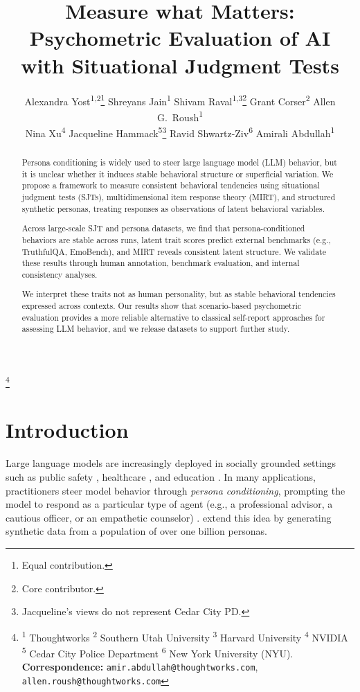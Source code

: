 \documentclass[11pt]{article}
\title{Measure what Matters: Psychometric Evaluation of AI with Situational Judgment Tests}
\author{
  Alexandra Yost\textsuperscript{1,2}\thanks{Equal contribution.}\quad
  Shreyans Jain\textsuperscript{1}\footnotemark[1]\quad
  Shivam Raval\textsuperscript{1,3}\thanks{Core contributor.}\quad
  Grant Corser\textsuperscript{2}\footnotemark[2]\quad
  Allen G.\ Roush\textsuperscript{1}\footnotemark[2]\\
  Nina Xu\textsuperscript{4}\footnotemark[2]\quad
  Jacqueline Hammack\textsuperscript{5}\thanks{Jacqueline's views do not represent Cedar City PD.}\quad
  Ravid Shwartz\mbox{-}Ziv\textsuperscript{6}\quad
  Amirali Abdullah\textsuperscript{1}\footnotemark[2]
}
\newcommand{\blfootnote}[1]{%
  \begingroup
  \renewcommand\thefootnote{}\footnote{#1}%
  \addtocounter{footnote}{-1}%
  \endgroup
}
\begin{document}
\maketitle

\blfootnote{\small
\textsuperscript{1} Thoughtworks \quad
\textsuperscript{2} Southern Utah University \quad
\textsuperscript{3} Harvard University \quad
\textsuperscript{4} NVIDIA \quad
\textsuperscript{5} Cedar City Police Department \quad
\textsuperscript{6} New York University (NYU).\\
\textbf{Correspondence: } \texttt{amir.abdullah@thoughtworks.com}, \texttt{allen.roush@thoughtworks.com}
}

\begin{abstract}

Persona conditioning is widely used to steer large language model (LLM) behavior, but it is unclear whether it induces stable behavioral structure or superficial variation. We propose a framework to measure consistent behavioral tendencies using situational judgment tests (SJTs), multidimensional item response theory (MIRT), and structured synthetic personas, treating responses as observations of latent behavioral variables.

Across large-scale SJT and persona datasets, we find that persona-conditioned behaviors are stable across runs, latent trait scores predict external benchmarks (e.g., TruthfulQA, EmoBench), and MIRT reveals consistent latent structure. We validate these results through human annotation, benchmark evaluation, and internal consistency analyses.

We interpret these traits not as human personality, but as stable behavioral tendencies expressed across contexts. Our results show that scenario-based psychometric evaluation provides a more reliable alternative to classical self-report approaches for assessing LLM behavior, and we release datasets to support further study.
\end{abstract}

\section{Introduction}

Large language models are increasingly deployed in socially grounded settings such as public safety \citep{application_safety_1, application_safety_2}, healthcare \citep{application_health_1, application_health_2}, and education \citep{application_education_1, application_education_2}. In many applications, practitioners steer model behavior through \emph{persona conditioning}, prompting the model to respond as a particular type of agent (e.g., a professional advisor, a cautious officer, or an empathetic counselor) \citep{luz2025helpful,personas_survey}. \citet{scaling_personas} extend this idea by generating synthetic data from a population of over one billion personas.
\end{document}
